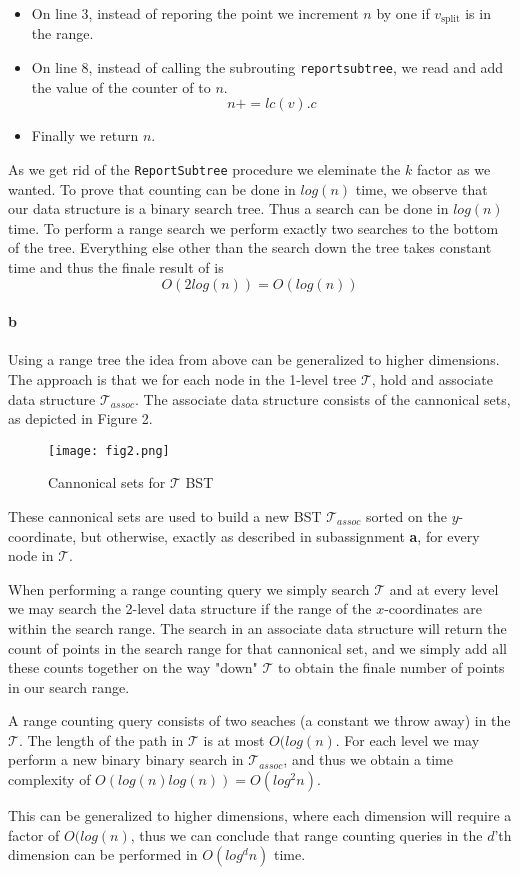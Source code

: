 \documentclass[10pt,a4paper,final,oneside,openany,article]{memoir}
\begin{document}
\begin{itemize}
    \item On line 3, instead of reporing the point we increment $n$ by one if
$v_{\textrm{split}}$ is in the range.
    \item On line 8, instead of calling the subrouting \texttt{reportsubtree},
    we read and add the value of the counter of to $n$.
    $$n += lc(v).c$$
    \item Finally we return $n$.
\end{itemize}
As we get rid of the \texttt{ReportSubtree} procedure we eleminate the $k$
factor as we wanted. To prove that counting can be done in $log(n)$ time, we
observe that our data structure is a binary search tree. Thus a search can be
done in $log(n)$ time. To perform a range search we perform exactly two searches
to the bottom of the tree. Everything else other than the search down the tree
takes constant time and thus the finale result of is 
$$O(2log(n)) = O(log(n))$$

\paragraph{b} Using a range tree the idea from above can be generalized to
higher dimensions. The approach is that we for each node in the 1-level tree
$\mathcal{T}$, hold and associate data structure $\mathcal{T}_{assoc}$. The
associate data structure consists of the cannonical sets, as depicted in Figure 2.
\begin{figure}[htbp]
    \centering
    \texttt{[image: fig2.png]}
    \caption{Cannonical sets for $\mathcal{T}$ BST}
    \label{fig:2}
\end{figure}

These cannonical sets are used to build a new BST $\mathcal{T}_{assoc}$ sorted
on the $y$-coordinate, but otherwise, exactly as described in subassignment
\textbf{a}, for every node in $\mathcal{T}$.

When performing a range counting query we simply search $\mathcal{T}$ and
at every level we may search the 2-level data structure if the range of the
$x$-coordinates are within the search range. The search in an associate data
structure will return the count of points in the search range for that
cannonical set, and we simply add all these counts together on the way "down"
$\mathcal{T}$ to obtain the finale number of points in our search range.

A range counting query consists of two seaches (a constant we throw
away) in the $\mathcal{T}$. The length of the path in $\mathcal{T}$ is
at most $O(log(n)$. For each level we may perform a new binary binary
search in $\mathcal{T}_{assoc}$, and thus we obtain a time complexity of
$O(log(n)log(n)) = O(log^{2}n)$.

This can be generalized to higher dimensions, where each dimension will
require a factor of $O(log(n)$, thus we can conclude that range counting
queries in the $d$'th dimension can be performed in $O(log^{d}n)$ time.
\end{document}
